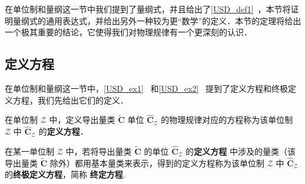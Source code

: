 
\begin{issues}
\issueTODO
\end{issues}

在单位制和量纲这一节中我们提到了量纲式，并且给出了\autoref{USD_def1}~，本节将证明量纲式的通用表达式，并给出另外一种较为更“数学”的定义．本节的定理将给出一个极其重要的结论，它使得我们对物理规律有一个更深刻的认识．
\subsection{定义方程}
在单位制和量纲这一节中，\autoref{USD_ex1}~ 和\autoref{USD_ex2}~ 提到了定义方程和终极定义方程，我们先给出它们的定义．
\begin{definition}{}
在单位制 $\mathscr{Z}$ 中，定义导出量类 $\tilde{\boldsymbol{C}}$ 单位 $\hat{\boldsymbol{C}}_{\mathscr{Z}}$ 的物理规律对应的方程称为该单位制 $\mathscr{Z}$ 中 $\hat{\boldsymbol{C}}_{\mathscr{Z}}$ 的\textbf{定义方程}．
\end{definition}
\begin{definition}{}
在某一单位制 $\mathscr{Z}$ 中，若将导出量类 $\tilde{\boldsymbol{C}}$ 的单位 $\hat{\boldsymbol{C}}_{\mathscr{Z}}$ 的\textbf{定义方程} 中涉及的量类（该导出量类 $\tilde{\boldsymbol{C}}$ 除外）都用基本量类来表示，得到的定义方程称为该单位制 $\mathscr{Z}$ 中 $\hat{\boldsymbol{C}}_{\mathscr{Z}}$ 的\textbf{终极定义方程}，简称 \textbf{终定方程}.
\end{definition}

